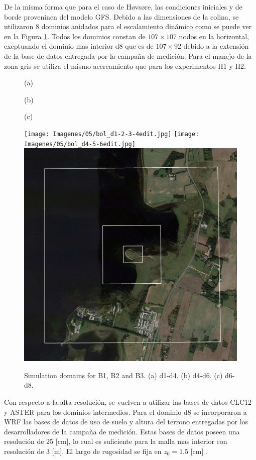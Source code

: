 De la misma forma que para el caso de Høvsøre, las condiciones iniciales y de borde proveninen del modelo GFS. Debido a las dimensiones de la colina, se utilizaron 8 dominios anidados para el escalamiento dinámico como se puede ver en la Figura \ref{fig:05_dom_bol}. Todos los dominios constan de $107\times107$ nodos en la horizontal, exeptuando el dominio mas interior d8 que es de $107\times92$ debido a la extensión de la base de datos entregada por la campaña de medición. Para el manejo de la zona gris se utiliza el mismo acercamiento que para los experimentos H1 y H2.

\begin{figure}[H]
	\begin{minipage}{0.05\linewidth}
		\hfill
	\end{minipage}%
	\begin{minipage}{0.3\linewidth}
		\center \hspace{-3mm}(a)
	\end{minipage}%
	\begin{minipage}{0.3\linewidth}
		\center (b)
	\end{minipage}%
\begin{minipage}{0.3\linewidth}
	\center (c)
\end{minipage}%
\begin{minipage}{0.05\linewidth}
\end{minipage}%

	\centering
	\texttt{[image: Imagenes/05/bol\_d1-2-3-4edit.jpg]}
	\texttt{[image: Imagenes/05/bol\_d4-5-6edit.jpg]}
	\includegraphics[width=0.3\linewidth,page=1,trim={5mm 3mm 3mm 3mm},clip,frame]{Imagenes/05/bol_d6-7-8edit.jpg}%
	
	\caption{Simulation domains for B1, B2 and B3. (a) d1-d4. (b) d4-d6. (c) d6-d8.}
	\label{fig:05_dom_bol}
\end{figure}

Con respecto a la alta resolución, se vuelven a utilizar las bases de datos CLC12 y ASTER para los dominios intermedios. Para el dominio d8 se incorporaron a WRF las bases de datos de uso de suelo y altura del terrono entregadas por los desarrolladores de la campaña de medición. Estas bases de datos poseen una resolución de 25 [cm], lo cual es suficiente para la malla mas interior con resolución de 3 [m]. El largo de rugosidad se fija en $z_0=1.5$ [cm] \citep{Bechmann2011}.

